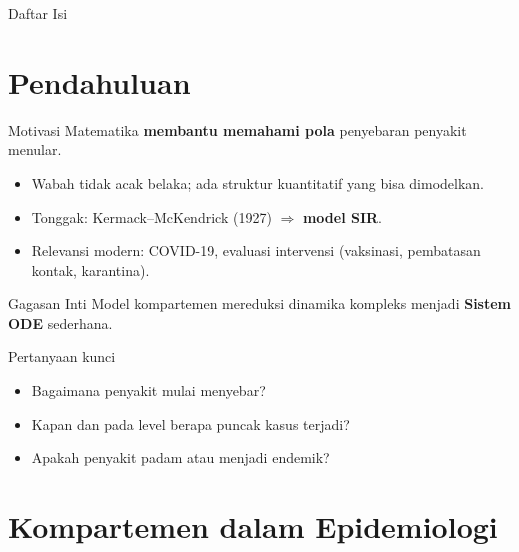 \documentclass[aspectratio=32]{beamer}
\newcommand{\jsg}[1]{\textcolor{teal!60!black}{\textbf{#1}}}
\begin{document}
\begin{frame}{Daftar Isi}
  \tableofcontents
\end{frame}

\section{Pendahuluan}

\begin{frame}{Motivasi}
Matematika \jsg{membantu memahami pola} penyebaran penyakit menular.
\begin{itemize}
  \item Wabah tidak acak belaka; ada struktur kuantitatif yang bisa dimodelkan.
  \item Tonggak: Kermack--McKendrick (1927) $\Rightarrow$ \jsg{model SIR}.
  \item Relevansi modern: COVID-19, evaluasi intervensi (vaksinasi, pembatasan kontak, karantina).
\end{itemize}
\end{frame}

\begin{frame}{Gagasan Inti}
Model kompartemen mereduksi dinamika kompleks menjadi \jsg{Sistem ODE} sederhana.
\begin{block}{Pertanyaan kunci}
\begin{itemize}
  \item Bagaimana penyakit mulai menyebar?
  \item Kapan dan pada level berapa puncak kasus terjadi?
  \item Apakah penyakit padam atau menjadi endemik?
\end{itemize}
\end{block}
\end{frame}

\section{Kompartemen dalam Epidemiologi}
\end{document}
